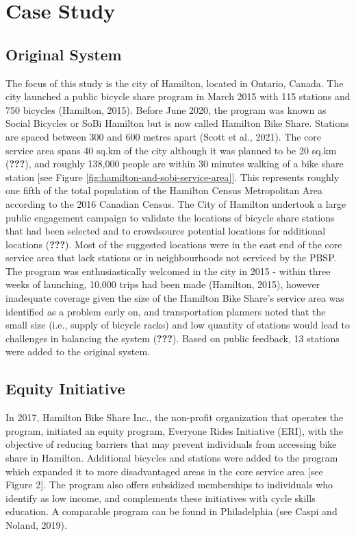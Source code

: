 \documentclass[]{elsarticle} %
\begin{document}
\hypertarget{sec:study}{%
\section{Case Study}\label{sec:study}}

\hypertarget{original-system}{%
\subsection{Original System}\label{original-system}}

The focus of this study is the city of Hamilton, located in Ontario,
Canada. The city launched a public bicycle share program in March 2015
with 115 stations and 750 bicycles (Hamilton, 2015). Before June 2020,
the program was known as Social Bicycles or SoBi Hamilton but is now
called Hamilton Bike Share. Stations are spaced between 300 and 600
metres apart (Scott et al., 2021). The core service area spans 40 sq.km
of the city although it was planned to be 20 sq.km ({\textbf{???}}), and
roughly 138,000 people are within 30 minutes walking of a bike share
station {[}see Figure \ref{fig:hamilton-and-sobi-service-area}{]}. This
represents roughly one fifth of the total population of the Hamilton
Census Metropolitan Area according to the 2016 Canadian Census. The City
of Hamilton undertook a large public engagement campaign to validate the
locations of bicycle share stations that had been selected and to
crowdsource potential locations for additional locations
({\textbf{???}}). Most of the suggested locations were in the east end
of the core service area that lack stations or in neighbourhoods not
serviced by the PBSP. The program was enthusiastically welcomed in the
city in 2015 - within three weeks of launching, 10,000 trips had been
made (Hamilton, 2015), however inadequate coverage given the size of the
Hamilton Bike Share's service area was identified as a problem early on,
and transportation planners noted that the small size (i.e., supply of
bicycle racks) and low quantity of stations would lead to challenges in
balancing the system ({\textbf{???}}). Based on public feedback, 13
stations were added to the original system.

\hypertarget{equity-initiative}{%
\subsection{Equity Initiative}\label{equity-initiative}}

In 2017, Hamilton Bike Share Inc., the non-profit organization that
operates the program, initiated an equity program, Everyone Rides
Initiative (ERI), with the objective of reducing barriers that may
prevent individuals from accessing bike share in Hamilton. Additional
bicycles and stations were added to the program which expanded it to
more disadvantaged areas in the core service area {[}see Figure 2{]}.
The program also offers subsidized memberships to individuals who
identify as low income, and complements these initiatives with cycle
skills education. A comparable program can be found in Philadelphia (see
Caspi and Noland, 2019).
\end{document}
